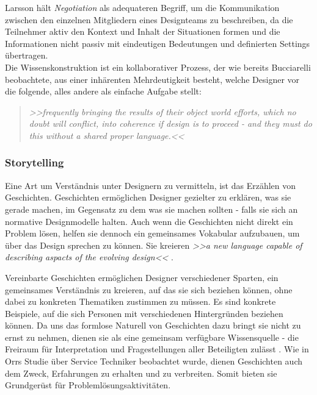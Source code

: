 \medskip Larsson hält \emph{Negotiation} als adequateren Begriff, um die Kommunikation zwischen den einzelnen Mitgliedern eines Designteams zu beschreiben, da die Teilnehmer aktiv den Kontext und Inhalt der Situationen formen und die Informationen nicht passiv mit eindeutigen Bedeutungen und definierten Settings übertragen. \citep{Larsson:2003} \\
Die Wissenskonstruktion ist ein kollaborativer Prozess, der wie bereits Bucciarelli beobachtete, aus einer inhärenten Mehrdeutigkeit besteht, welche Designer vor die folgende, alles andere als einfache Aufgabe stellt: 

\begin{quote}
	\textsl{>>frequently bringing the results of their object world efforts, which no doubt will conflict, into coherence if design is to proceed - and they must do this without a shared proper language.<<}
\begin{flushright}\citep{Bucciarelli:2002}\end{flushright}
\end{quote}

\subsubsection{Storytelling} 
Eine Art um Verständnis unter Designern zu vermitteln, ist das Erzählen von Geschichten. Geschichten ermöglichen Designer gezielter zu erklären, was sie gerade machen, im Gegensatz zu dem was sie machen sollten - falls sie sich an normative Designmodelle halten. Auch wenn die Geschichten nicht direkt ein Problem lösen, helfen sie dennoch ein gemeinsames Vokabular aufzubauen, um über das Design sprechen zu können. Sie kreieren \emph{>>a new language capable of describing aspacts of the evolving design<<} \citep{Lloyd:2000}.

\medskip Vereinbarte Geschichten ermöglichen Designer verschiedener Sparten, ein gemeinsames Verständnis zu kreieren, auf das sie sich beziehen können, ohne dabei zu konkreten Thematiken zustimmen zu müssen. Es sind konkrete Beispiele, auf die sich Personen mit verschiedenen Hintergründen beziehen können. Da uns das formlose Naturell von Geschichten dazu bringt sie nicht zu ernst zu nehmen, dienen sie als eine gemeinsam verfügbare Wissensquelle - die Freiraum für Interpretation und Fragestellungen aller Beteiligten zulässt \citep{Erickson:1996}. Wie in Orrs Studie über Service Techniker \citep{Orr:1986} beobachtet wurde, dienen Geschichten auch dem Zweck, Erfahrungen zu erhalten und zu verbreiten. Somit bieten sie Grundgerüst für Problemlösungsaktivitäten.


